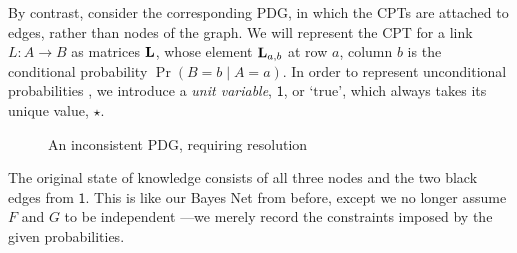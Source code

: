 \documentclass{article}
\newcommand\changed[1]{{\color{note-fg} #1}}
\newcommand{\MN}{PDG}
\begin{document}
\begin{example}
		By contrast, consider the corresponding \MN,
		in which the CPTs are attached to edges, rather than nodes of the graph. 
		We will represent the CPT for a link $L \!\colon\! A\!\to\! B$ as matrices $\mathbf L$, whose element $\mathbf L_{a,b}$ at row $a$, column $b$ is the conditional probability $\Pr(B \!\!=\!\!b \mid A \!\!=\!\! a)$. 		
		In order to represent unconditional probabilities%
		, we introduce a \emph{unit variable}, $\mathsf 1$, or `$\mathrm{true}$', which always takes its unique value, $\star$. 
		
		\begin{figure}[h]
			\centering
			\caption{An inconsistent \MN, requiring resolution}
			\label{fig:gun-floomp-diagram}
		\end{figure}
		
		The original state of knowledge consists of all three nodes and the two black edges from $\mathsf 1$. This is like our Bayes Net \changed{from before}, except \changed{we no longer assume $F$ and $G$ to be independent%
		}---we merely record the constraints imposed by the given probabilities.
	

\end{example}
\end{document}
